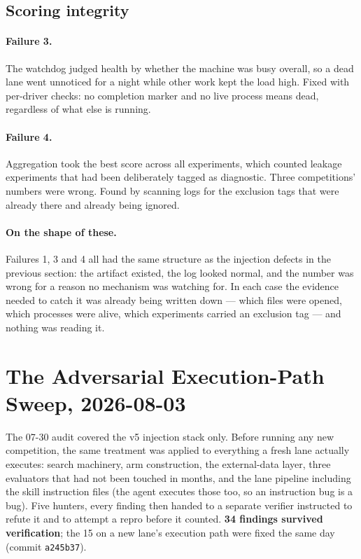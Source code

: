 \documentclass[11pt,a4paper]{article}
\begin{document}
\subsection{Scoring integrity}

\paragraph{Failure 3.} The watchdog judged health by whether the machine was busy overall, so a
dead lane went unnoticed for a night while other work kept the load high. Fixed with per-driver
checks: no completion marker and no live process means dead, regardless of what else is running.

\paragraph{Failure 4.} Aggregation took the best score across all experiments, which counted
leakage experiments that had been deliberately tagged as diagnostic. Three competitions'
numbers were wrong. Found by scanning logs for the exclusion tags that were already there and
already being ignored.

\paragraph{On the shape of these.} Failures 1, 3 and 4 all had the same structure as the
injection defects in the previous section: the artifact existed, the log looked normal, and the
number was wrong for a reason no mechanism was watching for. In each case the evidence needed to
catch it was already being written down --- which files were opened, which processes were alive,
which experiments carried an exclusion tag --- and nothing was reading it.

\section{The Adversarial Execution-Path Sweep, 2026-08-03}

The 07-30 audit covered the v5 injection stack only. Before running any new competition,
the same treatment was applied to everything a fresh lane actually executes: search
machinery, arm construction, the external-data layer, three evaluators that had not been
touched in months, and the lane pipeline including the skill instruction files (the agent
executes those too, so an instruction bug is a bug). Five hunters, every finding then
handed to a separate verifier instructed to refute it and to attempt a repro before it
counted. \textbf{34 findings survived verification}; the 15 on a new lane's execution path
were fixed the same day (commit \texttt{a245b37}).
\end{document}
